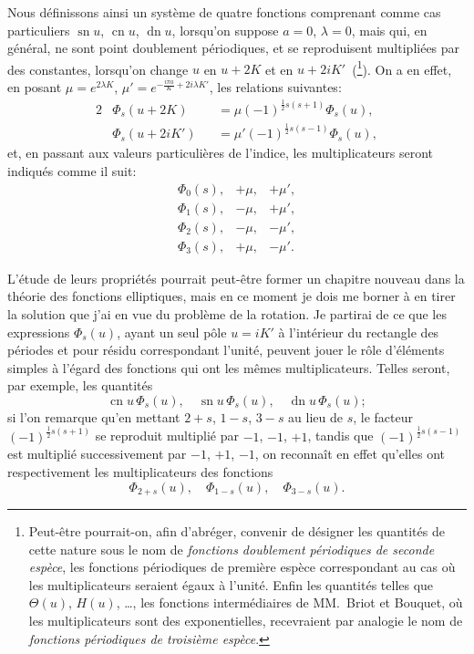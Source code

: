 \documentclass[11pt,leqno,oneside,letterpaper]{book}[2005/09/16]
\DeclareMathOperator{\sn}{sn}
\DeclareMathOperator{\cn}{cn}
\DeclareMathOperator{\dn}{dn}
\begin{document}
Nous d\'efinissons ainsi un syst\`eme de quatre fonctions comprenant
comme cas particuliers $\sn u$, $\cn u$, $\dn u$, lorsqu'on suppose $a = 0$, $\lambda = 0$,
mais qui, en g\'en\'eral, ne sont point doublement p\'eriodiques, et se reproduisent
multipli\'ees par des constantes, lorsqu'on change $u$ en $u + 2K$ et
en $u + 2iK'$~(\footnote{
  Peut-\^etre pourrait-on, afin d'abr\'eger, convenir de d\'esigner les quantit\'es de cette
  nature sous le nom de \textit{fonctions doublement p\'eriodiques de seconde esp\`ece}, les fonctions
  p\'eriodiques de premi\`ere esp\`ece correspondant au cas o\`u les multiplicateurs seraient \'egaux
  \`a l'unit\'e. Enfin les quantit\'es telles que $\Theta(u)$, $H(u)$,
\ldots, les fonctions interm\'ediaires de
  MM.~Briot et Bouquet, o\`u les multiplicateurs sont des exponentielles, recevraient par
  analogie le nom de \textit{fonctions p\'eriodiques de troisi\`eme esp\`ece}.}).
On a en effet, en posant $\mu = e^{2 \lambda K}$,
$\mu' = e^{-\frac{i\pi a}{K} + 2i \lambda K'}$, les
relations suivantes:
\begin{alignat*}{2}
& \Phi_s(u + 2K) &&= \mu (-1)^{\frac{1}{2}s(s + 1)} \Phi_s (u), \\
& \Phi_s(u + 2iK') &&= \mu'(-1)^{\frac{1}{2}s(s - 1)} \Phi_s (u),
\end{alignat*}
et, en passant aux valeurs particuli\`eres de l'indice, les multiplicateurs seront
indiqu\'es comme il suit:
\[
\begin{matrix}
\Phi_0 (s), & +\mu, & +\mu',\\
\Phi_1 (s), & -\mu, & +\mu',\\
\Phi_2 (s), & -\mu, & -\mu',\\
\Phi_3 (s), & +\mu, & -\mu'.
\end{matrix}
\]

L'\'etude de leurs propri\'et\'es pourrait peut-\^etre former un chapitre
nouveau dans la th\'eorie des fonctions elliptiques, mais en ce moment je
dois me borner \`a en tirer la solution que j'ai en vue du probl\`eme de la rotation.
Je partirai de ce que les expressions $\Phi_s(u)$, ayant un seul p\^ole $u = iK'$
\`a l'int\'erieur du rectangle des p\'eriodes et pour r\'esidu correspondant l'unit\'e,
peuvent jouer le r\^ole d'\'el\'ements simples \`a l'\'egard des fonctions qui ont
les m\^emes multiplicateurs. Telles seront, par exemple, les quantit\'es
\[
\cn u\, \Phi_s(u), \quad \sn u\, \Phi_s(u), \quad \dn u\, \Phi_s(u);
\]
si l'on remarque qu'en mettant $2+s$, $1-s$, $3-s$ au lieu de $s$, le facteur
$(-1)^{\frac{1}{2}s(s+1)}$ se reproduit multipli\'e par $-1$, $-1$, $+1$, tandis que
$(-1)^{\frac{1}{2}s(s-1)}$ est multipli\'e successivement par $-1$, $+1$, $-1$, on reconna\^it
en effet qu'elles ont respectivement les multiplicateurs des fonctions
\[
\Phi_{2+s}(u), \quad \Phi_{1-s}(u), \quad \Phi_{3-s}(u).
\]
\end{document}
